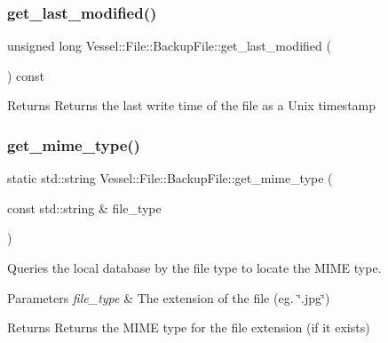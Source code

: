 \subsubsection{\texorpdfstring{get\+\_\+last\+\_\+modified()}{get\_last\_modified()}}
{\footnotesize\ttfamily unsigned long Vessel\+::\+File\+::\+Backup\+File\+::get\+\_\+last\+\_\+modified (\begin{DoxyParamCaption}{ }\end{DoxyParamCaption}) const}

\begin{DoxyReturn}{Returns}
Returns the last write time of the file as a Unix timestamp 
\end{DoxyReturn}
\mbox{\label{class_vessel_1_1_file_1_1_backup_file_aad30aceff344be7bc06f632e98303ac9}} 
\subsubsection{\texorpdfstring{get\+\_\+mime\+\_\+type()}{get\_mime\_type()}}
{\footnotesize\ttfamily static std\+::string Vessel\+::\+File\+::\+Backup\+File\+::get\+\_\+mime\+\_\+type (\begin{DoxyParamCaption}\item[{const std\+::string \&}]{file\+\_\+type }\end{DoxyParamCaption})\hspace{0.3cm}{\ttfamily [static]}}



Queries the local database by the file type to locate the M\+I\+ME type. 


\begin{DoxyParams}{Parameters}
{\em file\+\_\+type} & The extension of the file (eg. \char`\"{}.\+jpg\char`\"{}) \\
\hline
\end{DoxyParams}
\begin{DoxyReturn}{Returns}
Returns the M\+I\+ME type for the file extension (if it exists) 
\end{DoxyReturn}
\mbox{\label{class_vessel_1_1_file_1_1_backup_file_abbaa301d14ea7f03bac25b81d2e3149d}} 

